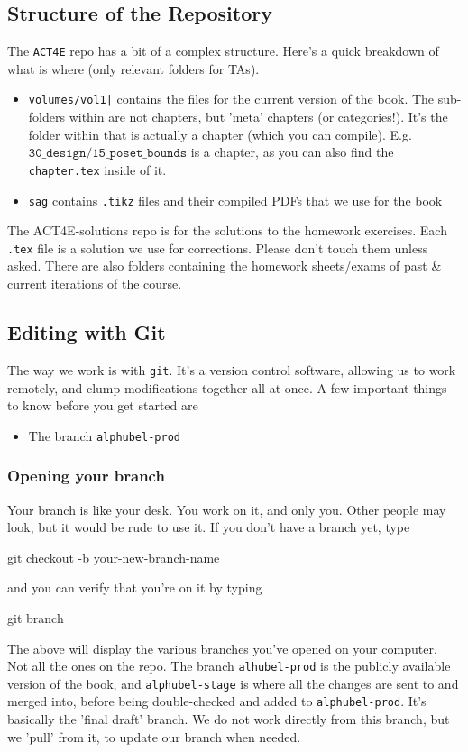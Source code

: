 \documentclass{article}
\begin{document}
\subsection{Structure of the Repository}
The \texttt{ACT4E} repo has a bit of a complex structure. Here's a quick breakdown of what is where (only relevant folders for TAs).
\begin{itemize}
    \item \texttt{volumes/vol1|} contains the files for the current version of the book. The sub-folders within are not chapters, but 'meta' chapters (or categories!). It's the folder within that is actually a chapter (which you can compile). E.g. $\texttt{30\_design/15\_poset\_bounds}$ is a chapter, as you can also find the \texttt{chapter.tex} inside of it.
    \item \texttt{sag} contains \texttt{.tikz} files and their compiled PDFs that we use for the book
\end{itemize}
The ACT4E-solutions repo is for the solutions to the homework exercises. Each \texttt{.tex} file is a solution we use for corrections. Please don't touch them unless asked. There are also folders containing the homework sheets/exams of past \& current iterations of the course.
\subsection{Editing with Git}
The way we work is with \texttt{git}. It's a version control software, allowing us to work remotely, and clump modifications together all at once. A few important things to know before you get started are
\begin{itemize}
\item The branch \texttt{alphubel-prod}
\end{itemize}
\subsubsection{Opening your branch}
Your branch is like your desk. You work on it, and only you. Other people may look, but it would be rude to use it. If you don't have a branch yet, type
\begin{bashcode}
     git checkout -b your-new-branch-name
\end{bashcode}
and you can verify that you're on it by typing
\begin{bashcode}
    git branch
\end{bashcode}
The above will display the various branches you've opened on your computer. Not all the ones on the repo. The branch \texttt{alhubel-prod} is the publicly available version of the book, and \texttt{alphubel-stage} is where all the changes are sent to and merged into, before being double-checked and added to \texttt{alphubel-prod}. It's basically the 'final draft' branch. We do not work directly from this branch, but we 'pull' from it, to update our branch when needed.
\end{document}
